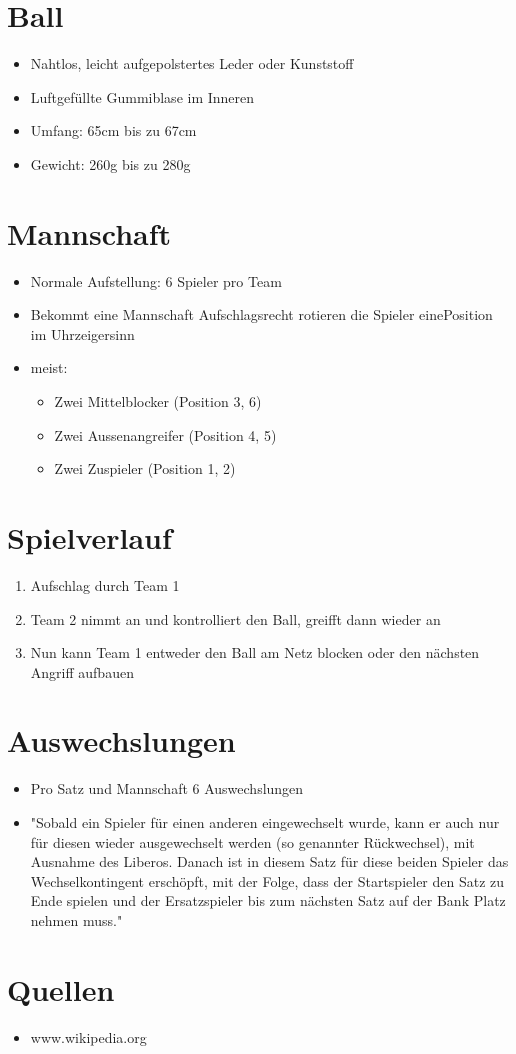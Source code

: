 \documentclass{article}
\begin{document}
\section{Ball}
\begin{itemize}
  \item Nahtlos, leicht aufgepolstertes Leder oder Kunststoff
  \item Luftgefüllte Gummiblase im Inneren
  \item Umfang: 65cm bis zu 67cm
  \item Gewicht: 260g bis zu 280g
\end{itemize}

\section{Mannschaft}
\begin{itemize}
  \item Normale Aufstellung: 6 Spieler pro Team
  \item Bekommt eine Mannschaft Aufschlagsrecht rotieren die Spieler eine\linebreak Position im Uhrzeigersinn
  \item meist:
  \begin{itemize}
    \item Zwei Mittelblocker (Position 3, 6)
    \item Zwei Aussenangreifer (Position 4, 5)
    \item Zwei Zuspieler (Position 1, 2)
  \end{itemize}
\end{itemize}

\section{Spielverlauf}
\begin{enumerate}
  \item Aufschlag durch Team 1
  \item Team 2 nimmt an und kontrolliert den Ball, greifft dann wieder an
  \item Nun kann Team 1 entweder den Ball am Netz blocken oder den nächsten Angriff aufbauen
\end{enumerate}

\section{Auswechslungen}
\begin{itemize}
  \item Pro Satz und Mannschaft 6 Auswechslungen
  \item "Sobald ein Spieler für einen anderen eingewechselt wurde, kann er auch nur für diesen wieder ausgewechselt werden (so genannter Rückwechsel), mit Ausnahme des Liberos. Danach ist in diesem Satz für diese beiden Spieler das Wechselkontingent erschöpft, mit der Folge, dass der Startspieler den Satz zu Ende spielen und der Ersatzspieler bis zum nächsten Satz auf der Bank Platz nehmen muss."
\end{itemize}

\section*{Quellen}
\begin{itemize}
  \item www.wikipedia.org
\end{itemize}
\end{document}
